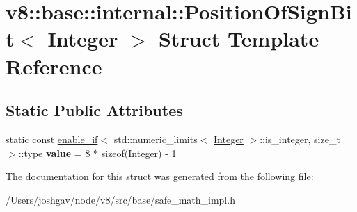 \hypertarget{structv8_1_1base_1_1internal_1_1_position_of_sign_bit}{}\section{v8\+:\+:base\+:\+:internal\+:\+:Position\+Of\+Sign\+Bit$<$ Integer $>$ Struct Template Reference}
\label{structv8_1_1base_1_1internal_1_1_position_of_sign_bit}
\subsection*{Static Public Attributes}
\begin{DoxyCompactItemize}
\item 
static const \hyperlink{structv8_1_1base_1_1internal_1_1enable__if}{enable\+\_\+if}$<$ std\+::numeric\+\_\+limits$<$ \hyperlink{classv8_1_1_integer}{Integer} $>$\+::is\+\_\+integer, size\+\_\+t $>$\+::type {\bfseries value} = 8 $\ast$ sizeof(\hyperlink{classv8_1_1_integer}{Integer}) -\/ 1\hypertarget{structv8_1_1base_1_1internal_1_1_position_of_sign_bit_ad29cf67660b8ffa1b8cc09181a5c779c}{}\label{structv8_1_1base_1_1internal_1_1_position_of_sign_bit_ad29cf67660b8ffa1b8cc09181a5c779c}

\end{DoxyCompactItemize}


The documentation for this struct was generated from the following file\+:\begin{DoxyCompactItemize}
\item 
/\+Users/joshgav/node/v8/src/base/safe\+\_\+math\+\_\+impl.\+h\end{DoxyCompactItemize}
